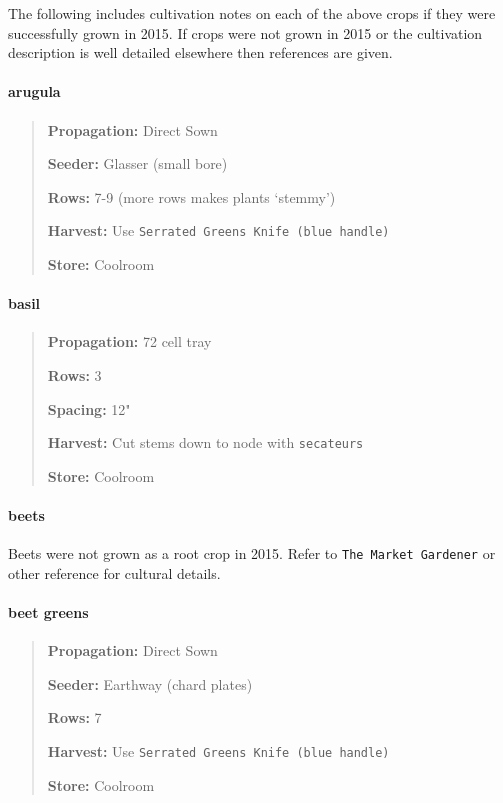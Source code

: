 The following includes cultivation notes on each of the above crops if
they were successfully grown in 2015. If crops were not grown in 2015 or
the cultivation description is well detailed elsewhere then references
are given.

\paragraph{arugula}\label{arugula}

\begin{quote}
\textbf{Propagation:} Direct Sown

\textbf{Seeder:} Glasser (small bore)

\textbf{Rows:} 7-9 (more rows makes plants `stemmy')

\textbf{Harvest:} Use \texttt{Serrated Greens Knife (blue handle)}

\textbf{Store:} Coolroom
\end{quote}

\paragraph{basil}\label{basil}

\begin{quote}
\textbf{Propagation:} 72 cell tray

\textbf{Rows:} 3

\textbf{Spacing:} 12"

\textbf{Harvest:} Cut stems down to node with \texttt{secateurs}

\textbf{Store:} Coolroom
\end{quote}

\paragraph{beets}\label{beets}

Beets were not grown as a root crop in 2015. Refer to
\texttt{The Market Gardener} or other reference for cultural details.

\paragraph{beet greens}\label{beet-greens}

\begin{quote}
\textbf{Propagation:} Direct Sown

\textbf{Seeder:} Earthway (chard plates)

\textbf{Rows:} 7

\textbf{Harvest:} Use \texttt{Serrated Greens Knife (blue handle)}

\textbf{Store:} Coolroom
\end{quote}

